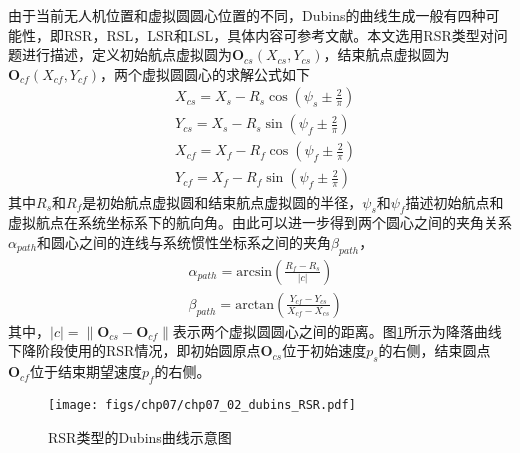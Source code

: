 由于当前无人机位置和虚拟圆圆心位置的不同，Dubins的曲线生成一般有四种可能性，即RSR，RSL，LSR和LSL，具体内容可参考文献\cite{tsourdos2010cooperative}。本文选用RSR类型对问题进行描述，定义初始航点虚拟圆为$\mathbf{O}_{cs}(X_{cs},Y_{cs})$，结束航点虚拟圆为$\mathbf{O}_{cf}(X_{cf}, Y_{cf})$，两个虚拟圆圆心的求解公式如下
\begin{align}
&X_{cs} = X_s - R_s \cos (\psi_s \pm \frac{2}{\pi}) \\
&Y_{cs} = X_s - R_s \sin (\psi_f \pm \frac{2}{\pi}) \\
&X_{cf} = X_f - R_f \cos (\psi_f \pm \frac{2}{\pi}) \\
&Y_{cf} = X_f - R_f \sin (\psi_f \pm \frac{2}{\pi})
\end{align}
其中$R_s$和$R_f$是初始航点虚拟圆和结束航点虚拟圆的半径，$\psi_s$和$\psi_f$描述初始航点和虚拟航点在系统坐标系下的航向角。由此可以进一步得到两个圆心之间的夹角关系$\alpha_{path}$和圆心之间的连线与系统惯性坐标系之间的夹角$\beta_{path}$，
\begin{align}
&\alpha_{path} = \text{arcsin}( \frac{R_f-R_s}{|c|}) \\
&\beta_{path} = \text{arctan} (\frac{Y_{cf}-Y_{cs}}{X_{cf}-X_{cs}})
\end{align}
其中，$|c|= \parallel \mathbf{O}_{cs} - \mathbf{O}_{cf} \parallel $表示两个虚拟圆圆心之间的距离。图\ref{fig:chp07_02_dubins_RSR}所示为降落曲线下降阶段使用的$\text{RSR}$情况，即初始圆原点$\mathbf{O}_{cs}$位于初始速度$p_s$的右侧，结束圆点$\mathbf{O}_{cf}$位于结束期望速度$p_f$的右侧。
\begin{figure}[ht]   
	\centering
	\texttt{[image: figs/chp07/chp07\_02\_dubins\_RSR.pdf]}
	\caption{RSR类型的Dubins曲线示意图}
	\label{fig:chp07_02_dubins_RSR}
\end{figure}

